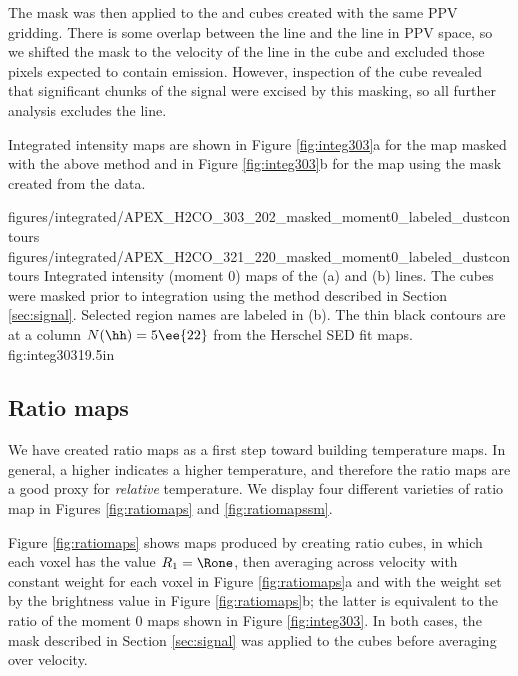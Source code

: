 The \para \threeohthree mask was then applied to the \threetwoone and
\threetwotwo cubes created with the same PPV gridding.  There is some overlap
between the \methanol \fourtwotwo line and the \para \threetwotwo line in PPV
space, so we shifted the \para \threeohthree mask to the velocity of the
\methanol line in the \para \threetwotwo cube and excluded those pixels expected
to contain \methanol emission.
However, inspection of the \threetwotwo cube revealed that significant chunks
of the \threetwotwo signal were excised by this masking, so all further
analysis excludes the \threetwotwo line.

Integrated intensity maps are shown in Figure
\ref{fig:integ303}a for the \threeohthree map masked with the above method
and in Figure \ref{fig:integ303}b for the \threetwoone map
using the mask created from the \threeohthree data.


\RotFigureTwoAA
{figures/integrated/APEX_H2CO_303_202_masked_moment0_labeled_dustcontours}
{figures/integrated/APEX_H2CO_321_220_masked_moment0_labeled_dustcontours}
{Integrated intensity (moment 0) maps of the (a) \para \threeohthree and (b)
\threetwoone lines.  The cubes were masked prior to integration using the
method described in Section \ref{sec:signal}.  Selected region names are
labeled in (b).  
 The thin black contours are at a column $N(\hh)=5\ee{22}$
\percc from the Herschel SED fit maps.
}
{fig:integ303}{1}{9.5in}

\subsection{Ratio maps}
\label{sec:ratio}
We have created \Rone ratio maps as a first step toward building temperature
maps.  In general, a higher \Rone indicates a higher temperature, and therefore
the ratio maps are a good proxy for \emph{relative} temperature.  We display
four different varieties of ratio map in Figures \ref{fig:ratiomaps} and
\ref{fig:ratiomapssm}.

Figure \ref{fig:ratiomaps} shows maps produced by creating ratio cubes, in which
each voxel has the value $R_1=\Rone$, then averaging across velocity with
constant weight for each voxel in Figure \ref{fig:ratiomaps}a and with the weight
set by the \threeohthree brightness value in Figure \ref{fig:ratiomaps}b; the latter is
equivalent to the ratio of the moment 0 maps shown in Figure
\ref{fig:integ303}.  In both
cases, the mask described in Section \ref{sec:signal} was applied to the cubes
before averaging over velocity.




